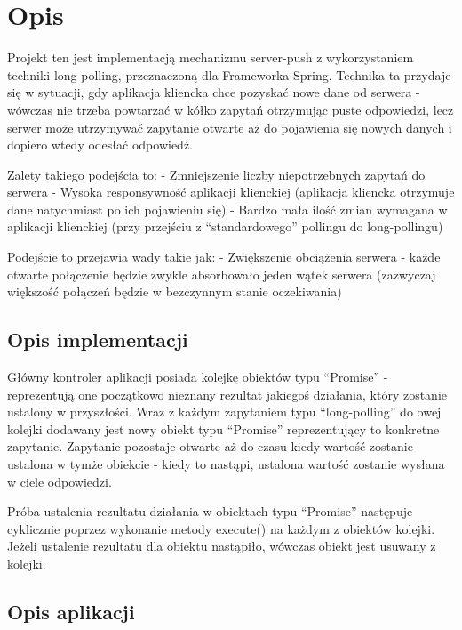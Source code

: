 \documentclass[]{article}
\date{}
\begin{document}
\hypertarget{opis}{%
\section{Opis}\label{opis}}

Projekt ten jest implementacją mechanizmu server-push z wykorzystaniem
techniki long-polling, przeznaczoną dla Frameworka Spring. Technika ta
przydaje się w sytuacji, gdy aplikacja kliencka chce pozyskać nowe dane
od serwera - wówczas nie trzeba powtarzać w kółko zapytań otrzymując
puste odpowiedzi, lecz serwer może utrzymywać zapytanie otwarte aż do
pojawienia się nowych danych i dopiero wtedy odesłać odpowiedź.

Zalety takiego podejścia to: - Zmniejszenie liczby niepotrzebnych
zapytań do serwera - Wysoka responsywność aplikacji klienckiej
(aplikacja kliencka otrzymuje dane natychmiast po ich pojawieniu się) -
Bardzo mała ilość zmian wymagana w aplikacji klienckiej (przy przejściu
z ``standardowego'' pollingu do long-pollingu)

Podejście to przejawia wady takie jak: - Zwiększenie obciążenia serwera
- każde otwarte połączenie będzie zwykle absorbowało jeden wątek serwera
(zazwyczaj większość połączeń będzie w bezczynnym stanie oczekiwania)

\hypertarget{opis-implementacji}{%
\subsection{Opis implementacji}\label{opis-implementacji}}

Główny kontroler aplikacji posiada kolejkę obiektów typu ``Promise'' -
reprezentują one początkowo nieznany rezultat jakiegoś działania, który
zostanie ustalony w przyszłości. Wraz z każdym zapytaniem typu
``long-polling'' do owej kolejki dodawany jest nowy obiekt typu
``Promise'' reprezentujący to konkretne zapytanie. Zapytanie pozostaje
otwarte aż do czasu kiedy wartość zostanie ustalona w tymże obiekcie -
kiedy to nastąpi, ustalona wartość zostanie wysłana w ciele odpowiedzi.

Próba ustalenia rezultatu działania w obiektach typu ``Promise''
następuje cyklicznie poprzez wykonanie metody execute() na każdym z
obiektów kolejki. Jeżeli ustalenie rezultatu dla obiektu nastąpiło,
wówczas obiekt jest usuwany z kolejki.

\hypertarget{opis-aplikacji}{%
\subsection{Opis aplikacji}\label{opis-aplikacji}}
\end{document}
